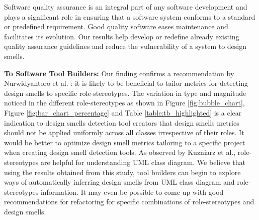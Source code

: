 \documentclass[AMA,Times1COL]{WileyNJDv5} %
\begin{document}
	Software quality assurance is an integral part of any software development and plays a significant role in ensuring that a software system conforms to a standard or predefined requirement. Good quality software eases maintenance and facilitates its evolution. Our results  help develop or redefine already existing quality assurance guidelines and reduce the vulnerability of a system to design smells.
	
	
	\textbf{To Software Tool Builders:}
	Our finding confirms a recommendation by Nurwidyantoro et al. \cite{nurwidyantoro2019automated}: it is likely to be beneficial to  tailor metrics for detecting design smells to specific role-stereotypes. The variation in type and magnitude noticed in the different role-stereotypes as shown in Figure \ref{fig:bubble_chart}, Figure \ref{fig:bar_chart_percentage} and Table \ref{table:tb_highlighted} is a clear indication to design smells detection tool creators that design smells metrics should not be applied uniformly across all classes irrespective of their roles. It would be better to optimize design smell metrics tailoring to a specific project when creating design smell detection tools. As observed by Kuzniarz et al.\cite{kuzniarz2004empirical}, role-stereotypes are helpful for understanding UML class diagram. We believe that using the results obtained from this study, tool builders can begin to explore ways of automatically inferring design smells from UML class diagram and role-stereotypes information. It may even be possible to come up with good recommendations for refactoring for specific combinations of role-stereotypes and design smells.
	
\end{document}
